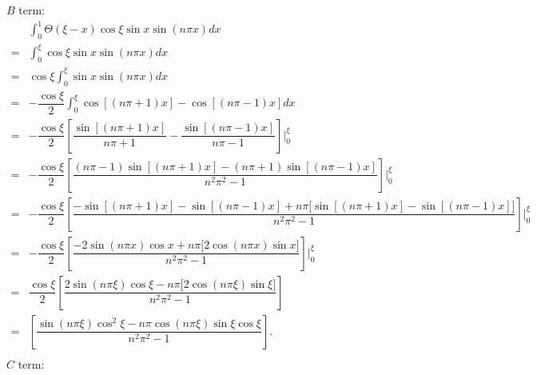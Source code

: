 \documentclass{article}
\newcommand{\f}[2]{\dfrac{#1}{#2}}
\newcommand{\at}[2]{\bigg\rvert_{#1}^{#2} }
\begin{document}
$B$ term:
\begin{align*}
	  & \int_{0}^{1} \Theta (\xi - x) \cos \xi \sin x \sin(n\pi x) dx                                                                                                    \\
	= & \int_{0}^{\xi} \cos \xi \sin x \sin(n\pi x) dx                                                                                                                   \\
	= & \cos \xi \int_{0}^{\xi} \sin x \sin(n\pi x) dx                                                                                                                   \\
	= & -\f{\cos \xi}{2} \int_{0}^{\xi} \cos\left[(n\pi+1)x\right] - \cos\left[(n\pi-1)x\right]dx                                                                        \\
	= & -\f{\cos \xi}{2} \left[\f{\sin\left[(n\pi+1)x\right]}{n\pi+1} - \f{\sin\left[(n\pi-1)x\right]}{n\pi - 1}\right] \at{0}{\xi}                                      \\
	= & -\f{\cos \xi}{2} \left[\f{(n\pi-1)\sin\left[(n\pi+1)x\right] - (n\pi + 1)\sin\left[(n\pi-1)x\right]}{n^2\pi^2-1}\right] \at{0}{\xi}                              \\
	= & -\f{\cos \xi}{2} \left[ \f{-\sin [(n\pi + 1)x] - \sin[(n\pi-1)x] + n\pi\bigl[ \sin [(n\pi + 1)x] - \sin [(n\pi - 1)x] \bigr] }{n^2 \pi^2 - 1} \right]\at{0}{\xi} \\
	= & -\f{\cos \xi}{2} \left[ \f{ -2 \sin(n\pi x)\cos x + n\pi \bigl[ 2 \cos(n\pi x)\sin x \bigr] }{n^2 \pi^2 - 1} \right] \at{0}{\xi}                                 \\
	= & \f{\cos \xi}{2} \left[ \f{ 2 \sin(n\pi \xi)\cos \xi - n\pi \bigl[ 2 \cos(n\pi \xi)\sin \xi \bigr] }{n^2 \pi^2 - 1} \right]                                       \\
	= & \left[ \f{ \sin(n\pi \xi)\cos^2 \xi - n\pi \cos(n\pi \xi)\sin \xi \cos \xi }{n^2 \pi^2 - 1} \right].                                                             \\
\end{align*}
$C$ term:
\end{document}
